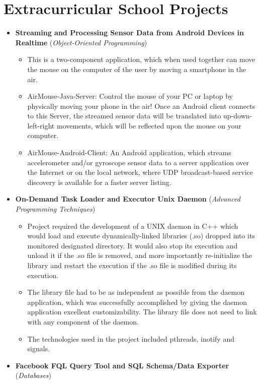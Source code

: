 \documentclass[11pt,a4paper]{article}
\begin{document}
\section*{Extracurricular School Projects}
	\begin{itemize}
	\item	\textbf{Streaming and Processing Sensor Data from Android Devices in Realtime} (\textit{Object-Oriented Programming})
		\begin{itemize}
		\item	This is a two-component application, which when used together can move the mouse on the computer of the user by moving a smartphone in the air.
		\item	AirMouse-Java-Server: Control the mouse of your PC or laptop by physically moving your phone in the air! Once an Android client connects to this Server, the streamed sensor data will be translated into up-down-left-right movements, which will be reflected upon the mouse on your computer.
		\item	AirMouse-Android-Client: An Android application, which streams accelerometer and/or gyroscope sensor data to a server application over the Internet or on the local network, where UDP broadcast-based service discovery is available for a faster server listing.
		\end{itemize}
	\item	\textbf{On-Demand Task Loader and Executor Unix Daemon} (\textit{Advanced Programming Techniques})
		\begin{itemize}
		\item	Project required the development of a UNIX daemon in C++ which would load and execute dynamically-linked libraries (.so) dropped into its monitored designated directory. It would also stop its execution and unload it if the .so file is removed, and more importantly re-initialize the library and restart the execution if the .so file is modified during its execution.
		\item	The library file had to be as independent as possible from the daemon application, which was successfully accomplished by giving the daemon application excellent customizability. The library file does not need to link with any component of the daemon.
		\item	The technologies used in the project included pthreads, inotify and signals.
		\end{itemize}
	\item	\textbf{Facebook FQL Query Tool and SQL Schema/Data Exporter} (\textit{Databases})

\end{itemize}
\end{document}
